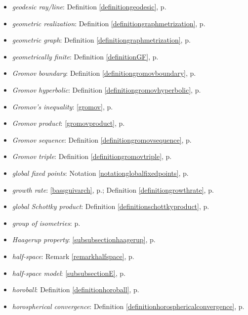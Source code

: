 \begin{itemize}
\item\emph{geodesic ray/line}: Definition \ref{definitiongeodesic}, p.\pageref{definitiongeodesic}
\item\emph{geometric realization}: Definition \ref{definitiongraphmetrization}, p.\pageref{definitiongraphmetrization}
\item\emph{geometric graph}: Definition \ref{definitiongraphmetrization}, p.\pageref{definitiongraphmetrization}
\item\emph{geometrically finite}: Definition \ref{definitionGF}, p.\pageref{definitionGF}
\item\emph{Gromov boundary}: Definition \ref{definitiongromovboundary}, p.\pageref{definitiongromovboundary}
\item\emph{Gromov hyperbolic}: Definition \ref{definitiongromovhyperbolic}, p.\pageref{definitiongromovhyperbolic}
\item\emph{Gromov's inequality}: \eqref{gromov}, p.\pageref{gromov}
\item\emph{Gromov product}: \eqref{gromovproduct}, p.\pageref{gromovproduct}
\item\emph{Gromov sequence}: Definition \ref{definitiongromovsequence}, p.\pageref{definitiongromovsequence}
\item\emph{Gromov triple}: Definition \ref{definitiongromovtriple}, p.\pageref{definitiongromovtriple}
\item\emph{global fixed points}: Notation \ref{notationglobalfixedpoints}, p.\pageref{notationglobalfixedpoints}
\item\emph{growth rate}: \eqref{bassguivarch}, p.\pageref{bassguivarch}; Definition \ref{definitiongrowthrate}, p.\pageref{definitiongrowthrate}
\item\emph{global Schottky product}: Definition \ref{definitionschottkyproduct}, p.\pageref{definitionschottkyproduct}
\item\emph{group of isometries}: p.\pageref{subsectionisometries}
\item\emph{Haagerup property}: \6\ref{subsubsectionhaagerup}, p.\pageref{subsubsectionhaagerup}
\item\emph{half-space}: Remark \ref{remarkhalfspace}, p.\pageref{remarkhalfspace}
\item\emph{half-space model}: \6\ref{subsubsectionE}, p.\pageref{subsubsectionE}
\item\emph{horoball}: Definition \ref{definitionhoroball}, p.\pageref{definitionhoroball}
\item\emph{horospherical convergence}: Definition \ref{definitionhorosphericalconvergence}, p.\pageref{definitionhorosphericalconvergence}

\end{itemize}
